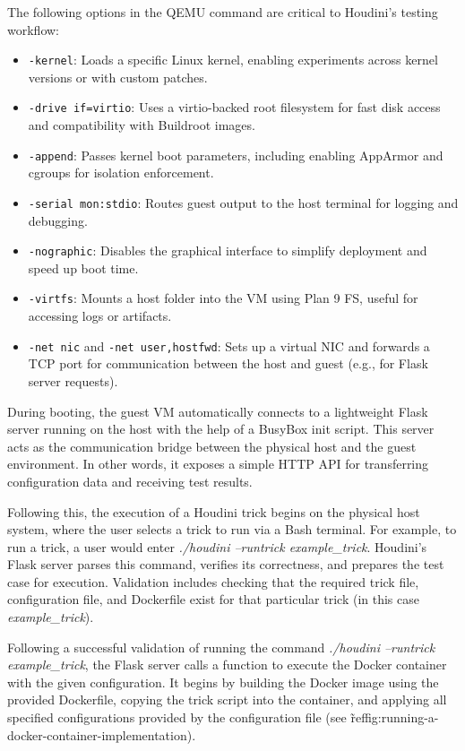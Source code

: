 \begin{doublespace}
The following options in the QEMU command are critical to Houdini's testing workflow:

\begin{itemize}
\item \texttt{-kernel}: Loads a specific Linux kernel, enabling experiments across kernel versions or with custom patches.
\item \texttt{-drive if=virtio}: Uses a virtio-backed root filesystem for fast disk access and compatibility with Buildroot images.
\item \texttt{-append}: Passes kernel boot parameters, including enabling AppArmor and cgroups for isolation enforcement.
\item \texttt{-serial mon:stdio}: Routes guest output to the host terminal for logging and debugging.
\item \texttt{-nographic}: Disables the graphical interface to simplify deployment and speed up boot time.
\item \texttt{-virtfs}: Mounts a host folder into the VM using Plan 9 FS, useful for accessing logs or artifacts.
\item \texttt{-net nic} and \texttt{-net user,hostfwd}: Sets up a virtual NIC and forwards a TCP port for communication between the host and guest (e.g., for Flask server requests).
\end{itemize}

During booting, the guest VM automatically connects to a lightweight Flask server running on the host with the help of a BusyBox init script. This server acts as the communication bridge between the physical host and the guest environment. In other words, it exposes a simple HTTP API for transferring configuration data and receiving test results.

Following this, the execution of a Houdini trick begins on the physical host system, where the user selects a trick to run via a Bash terminal. For example, to run a trick, a user would enter \textit{./houdini --runtrick example\_trick}. Houdini's Flask server parses this command, verifies its correctness, and prepares the test case for execution. Validation includes checking that the required trick file, configuration file, and Dockerfile exist for that particular trick (in this case \textit{example\_trick}).

Following a successful validation of running the command \textit{./houdini --runtrick example\_trick}, the Flask server calls a function to execute the Docker container with the given configuration. It begins by building the Docker image using the provided Dockerfile, copying the trick script into the container, and applying all specified configurations provided by the configuration file (see \~ref{fig:running-a-docker-container-implementation}).


\end{doublespace}
